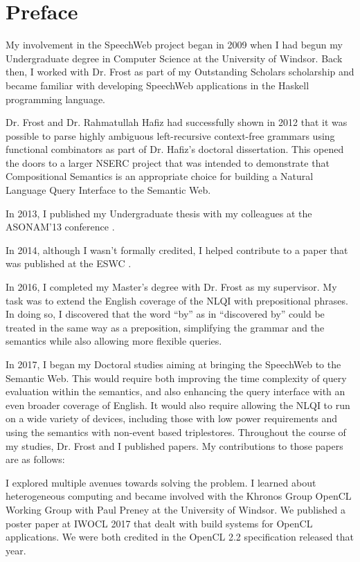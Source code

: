 \documentclass[../main.tex]{subfiles}
\begin{document}
\chapter{Preface}
\begin{refsection}
    My involvement in the SpeechWeb project began in 2009 when I had begun my Undergraduate
    degree in Computer Science at the University of Windsor.  Back then, I worked with Dr. Frost as part of my Outstanding Scholars scholarship and became familiar with developing SpeechWeb applications in the Haskell programming language.

    Dr. Frost and Dr. Rahmatullah Hafiz had successfully shown in 2012 that it was possible to parse highly ambiguous left-recursive context-free grammars using functional combinators as part of Dr. Hafiz's doctoral dissertation. This opened the doors to a larger NSERC project
    that was intended to demonstrate that Compositional Semantics is an appropriate choice
    for building a Natural Language Query Interface to the Semantic Web.

    In 2013, I published my Undergraduate thesis with my colleagues at the ASONAM'13 conference \cite{donais2013system}.

    In 2014, although I wasn't formally credited, I helped contribute to a paper that was published at the ESWC \cite{frost2014demonstration}.

    In 2016, I completed my Master's degree with Dr. Frost as my supervisor.  My task was to extend the English coverage of the NLQI with prepositional phrases.  In doing so, I discovered that the word ``by'' as in ``discovered by'' could be treated in the same way as a preposition, simplifying the grammar and the semantics while also allowing more flexible queries.

    In 2017, I began my Doctoral studies aiming at bringing the SpeechWeb to the Semantic Web.
    This would require both improving the time complexity of query evaluation within the semantics, and also enhancing the query interface with an even broader coverage of English.  It would also require allowing the NLQI to run on a wide variety of devices, including those with low power requirements and using the semantics with non-event based triplestores.  Throughout the course of my studies, Dr. Frost and I published
    papers.  My contributions to those papers are as follows: %

    I explored multiple avenues towards solving the problem.  I learned about heterogeneous computing and became involved with the Khronos Group OpenCL Working Group with Paul Preney at the University of Windsor.  We published a poster paper at IWOCL 2017 that dealt with build systems for OpenCL applications.  We were both credited in the OpenCL 2.2 specification released that year.


\end{refsection}
\end{document}
